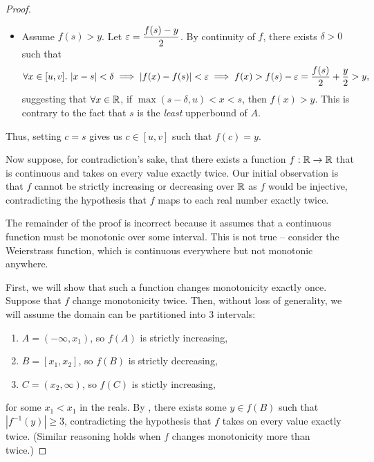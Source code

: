 \begin{problem}
\begin{proof}
\begin{subproof}
\begin{itemize}
        \item Assume $f(s) > y$. Let $\varepsilon = \dfrac{f(s) - y}{2}$. By continuity of $f$, there exists $\delta > 0$ 
          such that
          \[
            \forall x \in [u,v].\, \left\lvert x - s \right\rvert < \delta \implies \left\lvert f(x) - f(s) \right\rvert < \varepsilon \implies f(x) > f(s) - \varepsilon = \frac{f(s)}{2} + \frac{y}{2} > y,
          \]
          suggesting that $\forall x \in \mathbb{R}$, if $\max{(s - \delta, u)} < x < s$, then $f(x) > y$. This is contrary to the fact that
          $s$ is the \textit{least} upperbound of $A$.

      \end{itemize}

      Thus, setting $c = s$ gives us $c \in [u, v]$ such that $f(c) = y$.
    \end{subproof}

    Now suppose, for contradiction's sake, that there exists a function $f : \mathbb{R} \to \mathbb{R}$
    that is continuous and takes on every value exactly twice. Our initial
    observation is that $f$ cannot be strictly increasing or decreasing over 
    $\mathbb{R}$ as $f$ would be injective, contradicting the hypothesis that $f$ maps 
    to each real number exactly twice. 

    \begin{callout}
      The remainder of the proof is incorrect because it assumes that a continuous function
      must be monotonic over some interval. This is not true -- consider the
      Weierstrass function, which is continuous everywhere but not monotonic
      anywhere.
    \end{callout}

    First, we will show that such a function changes monotonicity exactly once.
    Suppose that $f$ change monotonicity twice. Then, without loss of generality, we will
    assume the domain can be partitioned into $3$ intervals:
    \begin{enumerate}[label=(\roman*)]
      \item $A = (-\infty, x_{1})$, so $f(A)$ is strictly increasing,
      \item $B = [x_{1}, x_{2}]$, so $f(B)$ is strictly decreasing,
      \item $C = (x_{2}, \infty)$, so $f(C)$ is stictly increasing,
    \end{enumerate}
    for some $x_{1} < x_{1}$ in the reals.
    By , there exists some $y \in f(B)$
    such that $|f^{-1}(y)| \geq 3$, contradicting the hypothesis that $f$ takes
    on every value exactly twice. (Similar reasoning holds when $f$ changes
    monotonicity more than twice.)


\end{proof}
\end{problem}
